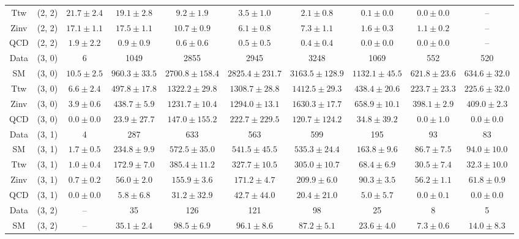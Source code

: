 \begin{table}[h!]
{\begin{tabular}{cccccccccc}
	Ttw & (2, 2) & $21.7\pm 2.4$ & $19.1\pm 2.8$ & $9.2\pm 1.9$ & $3.5\pm 1.0$ & $2.1\pm 0.8$ & $0.1\pm 0.0$ & $0.0\pm 0.0$ & -- \\[0.5ex] 
	Zinv & (2, 2) & $17.1\pm 1.1$ & $17.5\pm 1.1$ & $10.7\pm 0.9$ & $6.1\pm 0.8$ & $7.3\pm 1.1$ & $1.6\pm 0.3$ & $1.1\pm 0.2$ & -- \\[0.5ex] 
	QCD & (2, 2) & $1.9\pm 2.2$ & $0.9\pm 0.9$ & $0.6\pm 0.6$ & $0.5\pm 0.5$ & $0.4\pm 0.4$ & $0.0\pm 0.0$ & $0.0\pm 0.0$ & -- \\[0.5ex] 
	Data & (3, 0) & 6 & 1049 & 2855 & 2945 & 3248 & 1069 & 552 & 520 \\[0.5ex] 
	SM & (3, 0) & $10.5\pm 2.5$ & $960.3\pm 33.5$ & $2700.8\pm 158.4$ & $2825.4\pm 231.7$ & $3163.5\pm 128.9$ & $1132.1\pm 45.5$ & $621.8\pm 23.6$ & $634.6\pm 32.0$ \\[0.5ex] 
	Ttw & (3, 0) & $6.6\pm 2.4$ & $497.8\pm 17.8$ & $1322.2\pm 29.8$ & $1308.7\pm 28.8$ & $1412.5\pm 29.3$ & $438.4\pm 20.6$ & $223.7\pm 23.3$ & $225.6\pm 32.0$ \\[0.5ex] 
	Zinv & (3, 0) & $3.9\pm 0.6$ & $438.7\pm 5.9$ & $1231.7\pm 10.4$ & $1294.0\pm 13.1$ & $1630.3\pm 17.7$ & $658.9\pm 10.1$ & $398.1\pm 2.9$ & $409.0\pm 2.3$ \\[0.5ex] 
	QCD & (3, 0) & $0.0\pm 0.0$ & $23.9\pm 27.7$ & $147.0\pm 155.2$ & $222.7\pm 229.5$ & $120.7\pm 124.2$ & $34.8\pm 39.2$ & $0.0\pm 1.0$ & $0.0\pm 0.0$ \\[0.5ex] 
	Data & (3, 1) & 4 & 287 & 633 & 563 & 599 & 195 & 93 & 83 \\[0.5ex] 
	SM & (3, 1) & $1.7\pm 0.5$ & $234.8\pm 9.9$ & $572.5\pm 35.0$ & $541.5\pm 45.5$ & $535.3\pm 24.4$ & $163.8\pm 9.6$ & $86.7\pm 7.5$ & $94.0\pm 10.0$ \\[0.5ex] 
	Ttw & (3, 1) & $1.0\pm 0.4$ & $172.9\pm 7.0$ & $385.4\pm 11.2$ & $327.7\pm 10.5$ & $305.0\pm 10.7$ & $68.4\pm 6.9$ & $30.5\pm 7.4$ & $32.3\pm 10.0$ \\[0.5ex] 
	Zinv & (3, 1) & $0.7\pm 0.2$ & $56.0\pm 2.0$ & $155.9\pm 3.6$ & $171.2\pm 4.7$ & $209.9\pm 6.0$ & $90.3\pm 3.5$ & $56.2\pm 1.1$ & $61.8\pm 0.9$ \\[0.5ex] 
	QCD & (3, 1) & $0.0\pm 0.0$ & $5.8\pm 6.8$ & $31.2\pm 32.9$ & $42.7\pm 44.0$ & $20.4\pm 21.0$ & $5.0\pm 5.7$ & $0.0\pm 0.1$ & $0.0\pm 0.0$ \\[0.5ex] 
	Data & (3, 2) & -- & 35 & 126 & 121 & 98 & 25 & 8 & 5 \\[0.5ex] 
	SM & (3, 2) & -- & $35.1\pm 2.4$ & $98.5\pm 6.9$ & $96.1\pm 8.6$ & $87.2\pm 5.1$ & $23.6\pm 4.0$ & $7.3\pm 0.6$ & $14.0\pm 8.3$ \\[0.5ex] 

\end{tabular}}
\end{table}
